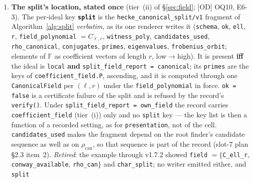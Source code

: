 \documentclass[11pt]{article}
\theoremstyle{remark}
\newcommand{\F}{\mathbb{F}}
\begin{document}
\begin{enumerate}[label=(\alph*)]
\begin{itemize}
    is what identifies systems across $n$; \texttt{system} and \texttt{base} are ids in the
    in-process atlas at the same settings, informative only. At every other $\ell$:
    \texttt{\{"status": "atlas\_unavailable"\}} and nothing else. On a non-local ideal, which
    has no character: \texttt{null}.
  \item \textbf{\texttt{s\_sep}}, record level, always present: at an atlas $\ell$,
    \texttt{\{"status": "computed", "primes": [...], "added": [...]\}} --- $S_{\mathrm{sep}}(\ell)$
    ascending, and $S_{\mathrm{sep}}(\ell)\setminus S_0$ ascending, the operators
    Algorithm~\ref{alg:stage2}(3) added (empty when $S_{\mathrm{sep}}(\ell)\subseteq S_0$, the
    vacuous case); the added operators appear in \texttt{operators\_computed}. At every other
    $\ell$: \texttt{\{"status": "atlas\_unavailable"\}}.
  \end{itemize}
\item \textbf{The split's location, stated once} (tier~(ii) of \S\ref{sec:field}; [OD] OQ10,
  E6-3). The per-ideal key \textbf{\texttt{split}} is the \texttt{hecke\_canonical\_split/v1}
  fragment of Algorithm~\ref{alg:split} \emph{verbatim}, as its one renderer writes it
  (\texttt{schema}, \texttt{ok}, \texttt{ell}, \texttt{r}, \texttt{field\_polynomial}
  $=C_{\ell,r}$, \texttt{witness\_poly}, \texttt{candidates\_used}, \texttt{rho\_canonical},
  \texttt{conjugates}, \texttt{primes}, \texttt{eigenvalues}, \texttt{frobenius\_orbit};
  elements of $\F$ as coefficient vectors of length $r$, low$\to$high). It is present
  \textbf{iff} the ideal is \texttt{local} \textbf{and} \texttt{split\_field\_report =
  canonical}; its \texttt{primes} are the keys of \texttt{coefficient\_field.P}, ascending, and
  it is computed through one \texttt{CanonicalField} per $(\ell,r)$ under the
  \texttt{field\_polynomial} in force. \texttt{ok = false} is a certificate failure of the
  split and is refused by the record's \texttt{verify()}. Under \texttt{split\_field\_report =
  own\_field} the record carries \texttt{coefficient\_field} (tier~(i)) only and no
  \texttt{split} key --- the key list is then a function of a recorded setting, as for
  \texttt{presentation}, not of the cell. \texttt{candidates\_used} makes the fragment depend
  on the root finder's candidate sequence as well as on $\rho_{\mathrm{can}}$, so that sequence
  is part of the record (slot-7 plan \S2.3 item~2). \emph{Retired}: the example through v1.7.2
  showed \texttt{field} $=\{$\texttt{C\_ell\_r}, \texttt{conway\_available},
  \texttt{rho\_can}$\}$ and \texttt{char\_split}; no writer emitted either, and \texttt{split}

\end{enumerate}
\end{document}
